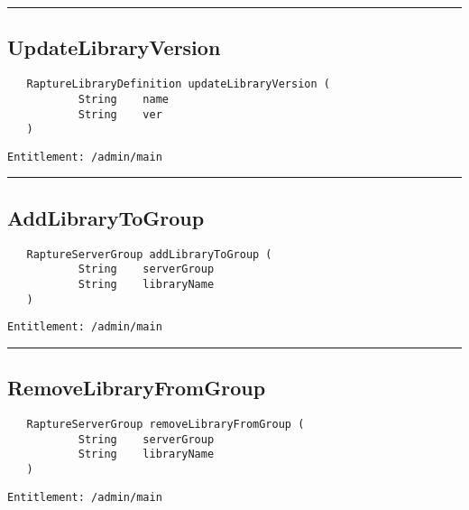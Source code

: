 \rule{12cm}{2pt}
\subsection{UpdateLibraryVersion}
\label{Api:UpdateLibraryVersion}
\begin{Verbatim}
   RaptureLibraryDefinition updateLibraryVersion (
           String    name
           String    ver
   )
\end{Verbatim}
\begin{Verbatim}[formatcom=\color{Maroon}]
  Entitlement: /admin/main
\end{Verbatim}



\rule{12cm}{2pt}
\subsection{AddLibraryToGroup}
\label{Api:AddLibraryToGroup}
\begin{Verbatim}
   RaptureServerGroup addLibraryToGroup (
           String    serverGroup
           String    libraryName
   )
\end{Verbatim}
\begin{Verbatim}[formatcom=\color{Maroon}]
  Entitlement: /admin/main
\end{Verbatim}



\rule{12cm}{2pt}
\subsection{RemoveLibraryFromGroup}
\label{Api:RemoveLibraryFromGroup}
\begin{Verbatim}
   RaptureServerGroup removeLibraryFromGroup (
           String    serverGroup
           String    libraryName
   )
\end{Verbatim}
\begin{Verbatim}[formatcom=\color{Maroon}]
  Entitlement: /admin/main
\end{Verbatim}



